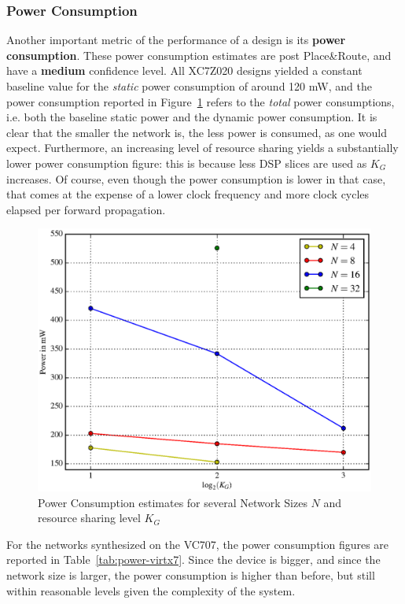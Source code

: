 \documentclass{IEEEtran}
\begin{document}
\subsubsection{Power Consumption}\label{sec:res-synth-power}
Another important metric of the performance of a design is its \textbf{power consumption}. These power consumption estimates are post Place\&Route, and
have a \textbf{medium} confidence level. All  XC7Z020 designs yielded a constant baseline value for the \emph{static} power consumption of around 120 mW,
and the power consumption reported
in Figure~\ref{fig:power} refers to the \emph{total} power consumptions, i.e. both the baseline static power and the dynamic power consumption.
It is clear that the smaller the network is, the less power is consumed, as one would expect. Furthermore, an increasing
level of resource sharing yields a substantially lower power consumption figure: this is because less DSP slices are used as $K_G$ increases.
Of course, even though the power consumption is lower in that case, that comes at the expense of a lower clock frequency and more clock cycles
elapsed per forward propagation.

\begin{figure}
    \centering
    \includegraphics[width=\linewidth]{figures/power.eps}
    \caption{Power Consumption estimates for several Network Sizes $N$ and resource sharing level $K_G$}
    \label{fig:power}
\end{figure}

For the networks synthesized on the VC707, the power consumption figures are reported in Table~\ref{tab:power-virtx7}. Since the device is bigger,
and since the network size is larger, the power consumption is higher than before, but still within reasonable levels given
the complexity of the system.
\end{document}
